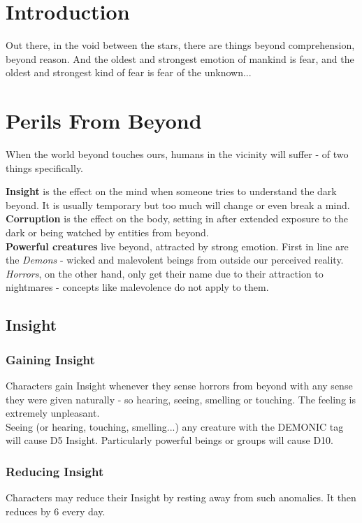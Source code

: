 \documentclass[12pt,a4paper,openany]{book}
\begin{document}
	
	
	\chapter{Introduction}
	Out there, in the void between the stars, there are things beyond comprehension, beyond reason. And the oldest and strongest emotion of mankind is fear, and the oldest and strongest kind of fear is fear of the unknown...

	\chapter{Perils From Beyond}
	When the world beyond touches ours, humans in the vicinity will suffer - of two things specifically.
	\par
	\textbf{Insight} is the effect on the mind when someone tries to understand the dark beyond. It is usually temporary but too much will change or even break a mind.
	\\
	\textbf{Corruption} is the effect on the body, setting in after extended exposure to the dark or being watched by entities from beyond.
	\\
	\textbf{Powerful creatures} live beyond, attracted by strong emotion. First in line are the \emph{Demons} - wicked and malevolent beings from outside our perceived reality. \emph{Horrors}, on the other hand, only get their name due to their attraction to nightmares - concepts like malevolence do not apply to them.
	
	\section{Insight}
	\subsection{Gaining Insight}
	Characters gain Insight whenever they sense horrors from beyond with any sense they were given naturally - so hearing, seeing, smelling or touching. The feeling is extremely unpleasant.
	\\
	Seeing (or hearing, touching, smelling...) any creature with the DEMONIC tag will cause D5 Insight. Particularly powerful beings or groups will cause D10.
	\subsection{Reducing Insight}
	Characters may reduce their Insight by resting away from such anomalies. It then reduces by 6 every day.
\end{document}
